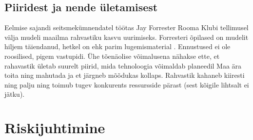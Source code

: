 \documentclass{tufte-book}
\begin{document}
\section{Piiridest ja nende ületamisest}
Eelmise sajandi seitsmekümnendatel töötas Jay Forrester Rooma Klubi tellimusel välja mudeli maailma rahvastiku kasvu uurimiseks. Forresteri õpilased on mudelit hiljem täiendanud, hetkel on ehk parim lugemismaterial \cite{meadows1992beyond}. Ennustused ei ole roosilised, pigem vastupidi. Ühe tõenäolise võimalusena nähakse ette, et rahavastik ületab suurelt piirid, mida tehnoloogia võimaldab planeedil Maa ära toita ning mahutada ja et järgneb mõõdukas kollaps. Rahvastik kahaneb kiiresti ning palju ning toimub tugev konkurents ressursside pärast (sest kõigile lihtsalt ei jätku). 

\chapter{Riskijuhtimine}
\end{document}
